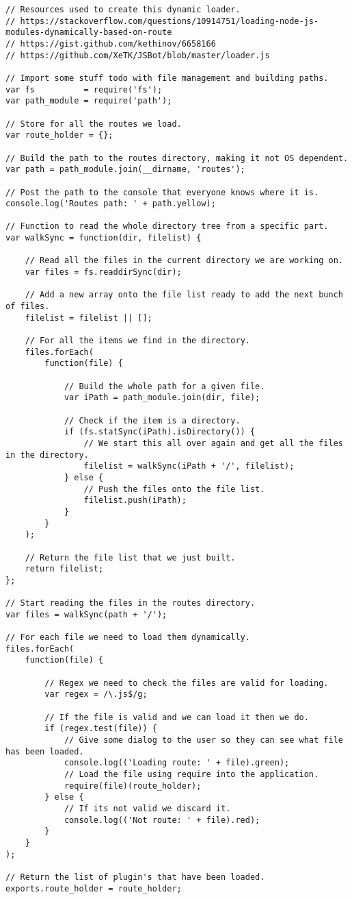 \lstjavascript
\begin{lstlisting}
// Resources used to create this dynamic loader.
// https://stackoverflow.com/questions/10914751/loading-node-js-modules-dynamically-based-on-route
// https://gist.github.com/kethinov/6658166
// https://github.com/XeTK/JSBot/blob/master/loader.js

// Import some stuff todo with file management and building paths.
var fs          = require('fs');
var path_module = require('path');

// Store for all the routes we load.
var route_holder = {};

// Build the path to the routes directory, making it not OS dependent.
var path = path_module.join(__dirname, 'routes');

// Post the path to the console that everyone knows where it is.
console.log('Routes path: ' + path.yellow);

// Function to read the whole directory tree from a specific part.
var walkSync = function(dir, filelist) {

    // Read all the files in the current directory we are working on.
    var files = fs.readdirSync(dir);

    // Add a new array onto the file list ready to add the next bunch of files.
    filelist = filelist || [];

    // For all the items we find in the directory.
    files.forEach(
        function(file) {

            // Build the whole path for a given file.
            var iPath = path_module.join(dir, file);

            // Check if the item is a directory.
            if (fs.statSync(iPath).isDirectory()) {
                // We start this all over again and get all the files in the directory.
                filelist = walkSync(iPath + '/', filelist);
            } else {
                // Push the files onto the file list.
                filelist.push(iPath);
            }
        }
    );

    // Return the file list that we just built.
    return filelist;
}; 

// Start reading the files in the routes directory.
var files = walkSync(path + '/');

// For each file we need to load them dynamically.
files.forEach(
    function(file) {
        
        // Regex we need to check the files are valid for loading.
        var regex = /\.js$/g;

        // If the file is valid and we can load it then we do.
        if (regex.test(file)) {
            // Give some dialog to the user so they can see what file has been loaded.
            console.log(('Loading route: ' + file).green);
            // Load the file using require into the application.
            require(file)(route_holder);
        } else {
            // If its not valid we discard it.
            console.log(('Not route: ' + file).red);
        }
    }
);

// Return the list of plugin's that have been loaded.
exports.route_holder = route_holder;
\end{lstlisting}